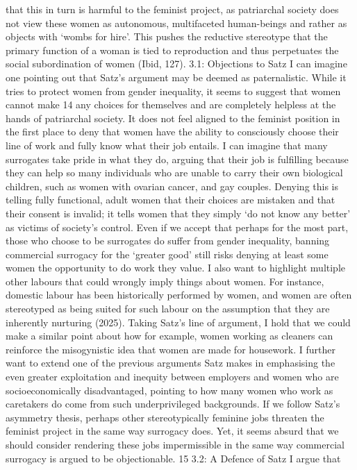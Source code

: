 that this in turn is harmful to the feminist project, as patriarchal
society does not view these women as autonomous, multifaceted
human-beings and rather as objects with `wombs for hire'. This pushes
the reductive stereotype that the primary function of a woman is tied to
reproduction and thus perpetuates the social subordination of women
(Ibid, 127). 3.1: Objections to Satz I can imagine one pointing out that
Satz's argument may be deemed as paternalistic. While it tries to
protect women from gender inequality, it seems to suggest that women
cannot make 14 any choices for themselves and are completely helpless at
the hands of patriarchal society. It does not feel aligned to the
feminist position in the first place to deny that women have the ability
to consciously choose their line of work and fully know what their job
entails. I can imagine that many surrogates take pride in what they do,
arguing that their job is fulfilling because they can help so many
individuals who are unable to carry their own biological children, such
as women with ovarian cancer, and gay couples. Denying this is telling
fully functional, adult women that their choices are mistaken and that
their consent is invalid; it tells women that they simply `do not know
any better' as victims of society's control. Even if we accept that
perhaps for the most part, those who choose to be surrogates do suffer
from gender inequality, banning commercial surrogacy for the `greater
good' still risks denying at least some women the opportunity to do work
they value. I also want to highlight multiple other labours that could
wrongly imply things about women. For instance, domestic labour has been
historically performed by women, and women are often stereotyped as
being suited for such labour on the assumption that they are inherently
nurturing (2025). Taking Satz's line of argument, I hold that we could
make a similar point about how for example, women working as cleaners
can reinforce the misogynistic idea that women are made for housework. I
further want to extend one of the previous arguments Satz makes in
emphasising the even greater exploitation and inequity between employers
and women who are socioeconomically disadvantaged, pointing to how many
women who work as caretakers do come from such underprivileged
backgrounds. If we follow Satz's asymmetry thesis, perhaps other
stereotypically feminine jobs threaten the feminist project in the same
way surrogacy does. Yet, it seems absurd that we should consider
rendering these jobs impermissible in the same way commercial surrogacy
is argued to be objectionable. 15 3.2: A Defence of Satz I argue that
